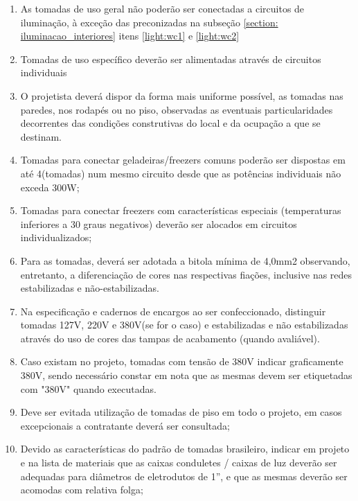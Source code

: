 \begin{enumerate}
	\item As tomadas de uso geral não poderão ser conectadas a circuitos de iluminação, à exceção das preconizadas na subseção \ref{section: iluminacao_interiores} itens \ref*{light:wc1} e \ref*{light:wc2}
	 
	\item Tomadas de uso específico deverão ser alimentadas através de circuitos individuais
	
	\item O projetista deverá dispor da forma mais uniforme possível, as tomadas nas paredes, nos rodapés ou no piso, observadas as eventuais particularidades decorrentes das condições construtivas do local e da ocupação a que se destinam.

	\item Tomadas para conectar geladeiras/freezers comuns poderão ser dispostas em até 4(tomadas) num mesmo circuito desde que as potências individuais não exceda 300W;
	
	\item Tomadas para conectar freezers com características especiais (temperaturas inferiores a 30 graus negativos) deverão ser alocados em circuitos individualizados;

	\item Para as tomadas, deverá ser adotada a bitola mínima de 4,0mm2 observando, entretanto, a diferenciação de cores nas respectivas fiações, inclusive nas redes estabilizadas e não-estabilizadas.

	\item Na especificação e cadernos de encargos ao ser confeccionado, distinguir tomadas 127V, 220V e 380V(se for o caso) e estabilizadas e não estabilizadas através do uso de cores das tampas de acabamento (quando avaliável).
	
	\item Caso existam no projeto, tomadas com tensão de 380V indicar graficamente 380V, sendo necessário constar em nota que as mesmas devem ser etiquetadas com "380V" quando executadas.
	
	\item Deve ser evitada utilização de tomadas de piso em todo o projeto, em casos excepcionais a contratante deverá ser consultada;
	
	\item Devido as características do padrão de tomadas brasileiro, indicar em projeto e na lista de materiais que as caixas conduletes / caixas de luz deverão ser adequadas para diâmetros de eletrodutos de 1”, e que as mesmas deverão ser acomodas com relativa folga;
	

\end{enumerate}
